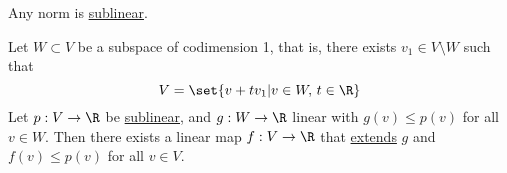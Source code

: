 \documentclass{article}
\begin{document}
\begin{eg}
    Any norm is \hyperlink{def:sublinear}{sublinear}.
\end{eg}

\begin{lemma}
    Let $W \subset V$ be a subspace of codimension 1, that is, there exists $v_1 \in V \setminus W$ such that
    \begin{equation*}
        V = \set{v + t v_1 | v \in W, \, t \in \R}
    \end{equation*}
    Let $p: V \to \R$ be \hyperlink{def:sublinear}{sublinear}, and $g: W \to \R$ linear with $ g(v) \leq p(v) $ for all $v \in W$.
    Then there exists a linear map $f: V \to \R$ that \hyperlink{def:extend}{extends} $g$ and $f(v) \leq p(v)$ for all $v \in V$.
\end{lemma}
\end{document}
